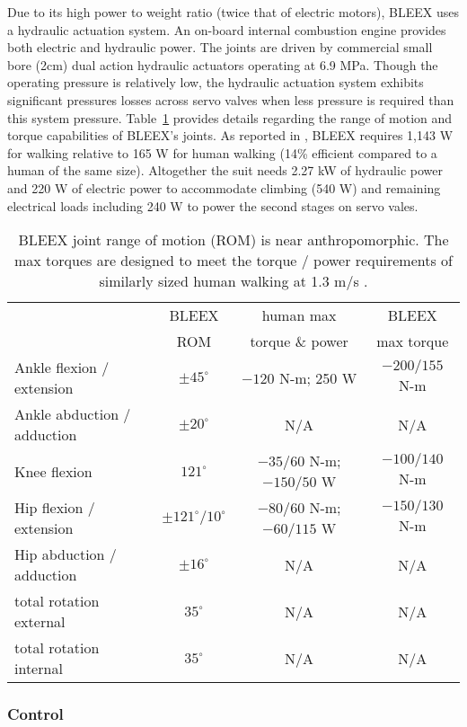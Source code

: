 Due to its high power to weight ratio (twice that of electric motors), BLEEX uses a hydraulic actuation system.  An on-board internal combustion engine provides both electric and hydraulic power.  The joints are driven by commercial small bore (2cm) dual action hydraulic actuators operating at 6.9 MPa. Though the operating pressure is relatively low, the hydraulic actuation system exhibits significant pressures losses across servo valves when less pressure is required than this system pressure.  Table~\ref{tab:bleex_joints} provides details regarding the range of motion and torque capabilities of BLEEX's joints.  As reported in \cite{bleex_design_2006}, BLEEX requires 1,143 W for walking relative to 165 W for human walking (14\% efficient compared to a human of the same size).  Altogether the suit needs 2.27 kW of hydraulic power and 220 W of electric power to accommodate climbing (540 W) and remaining electrical loads including 240 W to power the second stages on servo vales.

%
\begin{table}
\centering
\begin{tabular}{|l|*{3}{c|}}  %
\hline
& BLEEX & human max & BLEEX \\
& ROM & torque \& power & max torque \\ \hline
Ankle flexion / extension & $\pm 45^\circ$ & $-120$ N-m; 250 W & $-200 / 155$ N-m\\ \hline
Ankle abduction / adduction & $\pm 20^\circ$ & N/A & N/A \\ \hline
Knee flexion & $121^\circ$ & $-35 / 60$ N-m; $-150 / 50$ W & $-100 / 140$ N-m \\ \hline
Hip flexion / extension & $\pm 121^\circ / 10^\circ$ & $-80 / 60$ N-m; $-60 / 115$ W & $-150 / 130$ N-m \\ \hline
Hip abduction / adduction & $\pm 16^\circ$ & N/A & N/A\\ \hline
total rotation external & $35^\circ$ & N/A & N/A \\ \hline
total rotation internal & $35^\circ$ & N/A & N/A \\ \hline
\end{tabular}
\caption{BLEEX joint range of motion (ROM) is near anthropomorphic.  The max torques are designed to meet the torque / power requirements of similarly sized human walking at 1.3 m/s \cite{bleex_design_2006}.}\label{tab:bleex_joints}
\end{table}
%

\subsubsection{Control}







% 